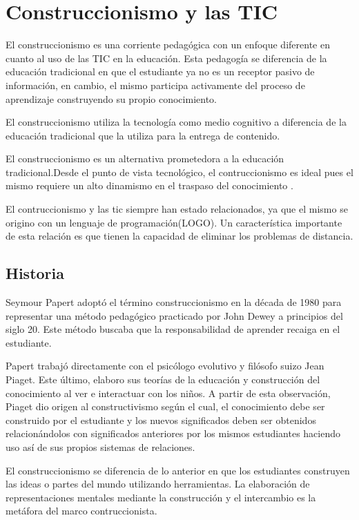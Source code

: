 \section{Construccionismo y las TIC}

El construccionismo es una corriente pedagógica con un enfoque diferente en cuanto 
al uso de las TIC en la educación. Esta pedagogía se diferencia de la educación tradicional en 
que el estudiante ya no es un receptor pasivo de información, en cambio, el mismo
participa activamente del proceso de aprendizaje construyendo su propio conocimiento. 

El construccionismo utiliza la tecnología como medio cognitivo  a diferencia de
la educación tradicional que la utiliza para la entrega de contenido. 

El construccionismo es un alternativa prometedora a la educación
tradicional.Desde el punto de vista tecnológico, el contruccionismo es ideal
pues el mismo requiere un alto dinamismo en el traspaso del conocimiento
\cite{sasha:construtivism}. 

El contruccionismo y las \Gls{tic} siempre han estado relacionados, ya que el
mismo se origino con un lenguaje de programación(LOGO)\cite{ict:ttc}. Un
característica importante de esta relación es que tienen la capacidad de
eliminar los problemas de distancia\cite{mariluz:seiousgames}.


\subsection{Historia}

Seymour Papert adoptó el término construccionismo en la década de 1980 para
representar una método pedagógico practicado por John Dewey a principios del
siglo 20. Este método buscaba que la responsabilidad de aprender recaiga en el
estudiante. 

Papert trabajó directamente con el psicólogo evolutivo y filósofo suizo Jean
Piaget. Este último, elaboro sus teorías de la educación y construcción del
conocimiento al ver e interactuar con los niños. A partir de esta observación, Piaget
dio origen al constructivismo según el cual, el conocimiento debe ser construido por
el estudiante y los nuevos significados deben ser obtenidos relacionándolos con
significados anteriores por los mismos estudiantes haciendo uso así de sus
propios sistemas de relaciones.

El construccionismo se diferencia de lo anterior en que los estudiantes
construyen las ideas o partes del mundo utilizando herramientas. La elaboración
de representaciones mentales mediante la construcción y el intercambio es la
metáfora del marco contruccionista. 

